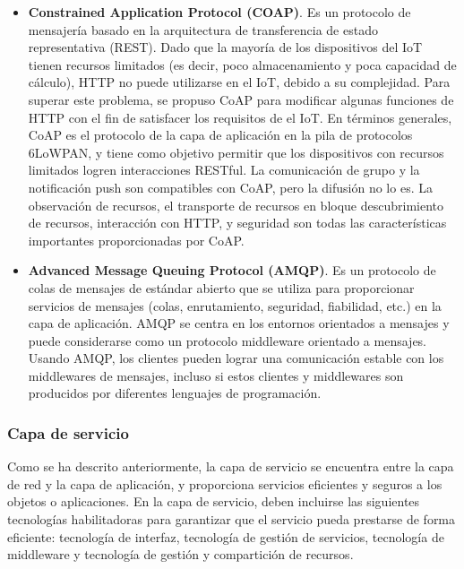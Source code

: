 {\begin{itemize}
    \item \textbf{Constrained Application Protocol (COAP)}. Es un protocolo de mensajería basado en la arquitectura de transferencia de estado representativa (REST). Dado que la mayoría de los dispositivos del IoT tienen recursos limitados (es decir, poco almacenamiento y poca capacidad de cálculo), HTTP no puede utilizarse en el IoT, debido a su complejidad. Para superar este problema, se propuso CoAP para modificar algunas funciones de HTTP con el fin de satisfacer los requisitos de el IoT. En términos generales, CoAP es el protocolo de la capa de aplicación en la pila de protocolos 6LoWPAN, y tiene como objetivo permitir que los dispositivos con recursos limitados logren interacciones RESTful. La comunicación de grupo y la notificación push son compatibles con CoAP, pero la difusión no lo es. La observación de recursos, el transporte de recursos en bloque descubrimiento de recursos, interacción con HTTP, y seguridad son todas las características importantes proporcionadas por CoAP.
    \item \textbf{Advanced Message Queuing Protocol (AMQP)}. Es un protocolo de colas de mensajes de estándar abierto que se utiliza para proporcionar servicios de mensajes (colas, enrutamiento, seguridad, fiabilidad, etc.) en la capa de aplicación. AMQP se centra en los entornos orientados a mensajes y puede considerarse como un protocolo middleware orientado a mensajes. Usando AMQP, los clientes pueden lograr una comunicación estable con los middlewares de mensajes, incluso si estos clientes y middlewares son producidos por diferentes lenguajes de programación. \cite{lin2017survey}
\end{itemize}

\subsubsection{Capa de servicio}

Como se ha descrito anteriormente, la capa de servicio se encuentra entre la capa de red y la capa de aplicación, y proporciona servicios eficientes y seguros a los objetos o aplicaciones. En la capa de servicio, deben incluirse las siguientes tecnologías habilitadoras para garantizar que el servicio pueda prestarse de forma eficiente: tecnología de interfaz, tecnología de gestión de servicios, tecnología de middleware y tecnología de gestión y compartición de recursos.

}
